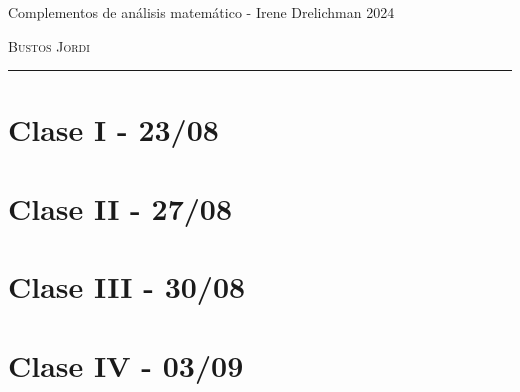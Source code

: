 \documentclass[12pt,a4paper]{book}
\begin{document}
\renewcommand{\contentsname}{\vspace{0cm} Contenido \vspace{-2cm}}

\begin{titlepage}
\vspace*{2cm}

\noindent
\vspace*{0.5cm}

\vspace{1.5cm}
\epigraph{Complementos de análisis matemático - Irene Drelichman 2024}%
{ \textsc{Bustos Jordi}}
\null\vfill
\vspace*{1cm}
\noindent
\hfill
\begin{minipage}{0.7\linewidth}
    \begin{flushright}
        \printauthor
    \end{flushright}
\end{minipage}
%
\begin{minipage}{0.02\linewidth}
    \rule{1pt}{70pt}
\end{minipage}
\titlepagedecoration
\end{titlepage}

\let\cleardoublepage=\clearpage
\tableofcontents
\blankpage

\chapter{Clase I - 23/08 }

\newpage\thispagestyle{empty}\blankpage
\chapter{Clase II - 27/08}

\newpage\thispagestyle{empty}\blankpage
\chapter{Clase III - 30/08}

\newpage\thispagestyle{empty}\blankpage
\chapter{Clase IV - 03/09}


\blankpage


\nocite{*}
\end{document}
